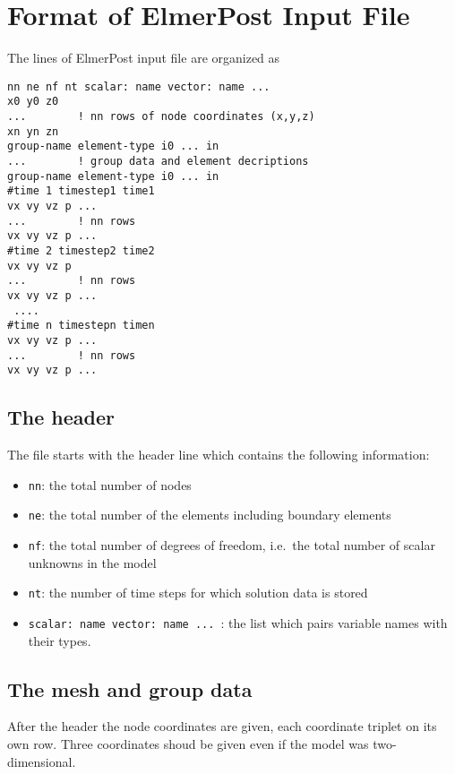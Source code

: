 \chapter{Format of ElmerPost Input File}
\label{chapter-post-format}

The lines of ElmerPost input file are organized as

\begin{verbatim}
nn ne nf nt scalar: name vector: name ...
x0 y0 z0
...        ! nn rows of node coordinates (x,y,z)
xn yn zn
group-name element-type i0 ... in
...        ! group data and element decriptions
group-name element-type i0 ... in
#time 1 timestep1 time1
vx vy vz p ...
...        ! nn rows 
vx vy vz p ...
#time 2 timestep2 time2
vx vy vz p
...        ! nn rows 
vx vy vz p ...
 ....
#time n timestepn timen
vx vy vz p ...
...        ! nn rows 
vx vy vz p ...
\end{verbatim}

\section*{The header}
The file starts with the header line which contains the 
following information:
\begin{itemize}
\item {\tt nn}: the total number of nodes
\item {\tt ne}: the total number of the elements including boundary elements
\item {\tt nf}: the total number of degrees of freedom, i.e.\ the total number of
scalar unknowns in the model
\item {\tt nt}: the number of time steps for which solution data is stored
\item {\tt scalar: name vector: name ... }: the list which pairs variable names with
their types.
\end{itemize}

\section*{The mesh and group data}

After the header the node coordinates are given, each coordinate triplet on its own row. 
Three coordinates shoud be given even if the model was two-dimensional.

